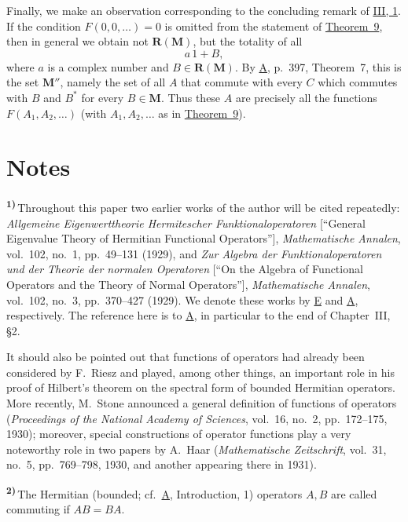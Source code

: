 \documentclass[12pt,b5paper,twoside]{article}
\newcommand{\originalnote}[1]{%
  \par\smallskip\noindent\hypertarget{note:#1}{\textsuperscript{\textbf{#1)}}}\,}
\begin{document}
Finally, we make an observation corresponding to the concluding remark of
\hyperref[sec:III.1]{III, 1}.  If the condition $F(0,0,\ldots)=0$ is omitted from the
statement of \hyperref[thm:9]{Theorem~9}, then in general we obtain not
$\mathbf R(\mathbf M)$, but the totality of all
\[
 a\,1+B,
\]
where $a$ is a complex number and $B\in \mathbf R(\mathbf M)$.  By \hyperref[ref:A]{A}, p.~397,
Theorem~7, this is the set $\mathbf M''$, namely the set of all $A$ that commute
with every $C$ which commutes with $B$ and $B^*$ for every $B\in \mathbf M$.  Thus
these $A$ are precisely all the functions $F(A_1,A_2,\ldots)$ (with
$A_1,A_2,\ldots$ as in \hyperref[thm:9]{Theorem~9}).

\section*{Notes}
\label{sec:notes}

\originalnote{1}Throughout this paper two earlier works of the author will be cited
repeatedly: \label{ref:E}\emph{Allgemeine Eigenwerttheorie
Hermitescher Funktionaloperatoren} [``General Eigenvalue Theory of Hermitian
Functional Operators''], \emph{Mathematische Annalen}, vol.~102, no.~1,
pp.~49--131 (1929), and \label{ref:A}\emph{Zur Algebra der
Funktionaloperatoren und der Theorie der normalen Operatoren} [``On the Algebra
of Functional Operators and the Theory of Normal Operators''],
\emph{Mathematische Annalen}, vol.~102, no.~3, pp.~370--427 (1929).  We denote these
works by \hyperref[ref:E]{E} and \hyperref[ref:A]{A}, respectively.  The reference here is to
\hyperref[ref:A]{A}, in particular to the end
of Chapter~III, \S2.

It should also be pointed out that functions of operators had already been considered
by F.~Riesz and played, among other things, an important role in his proof of Hilbert's
theorem on the spectral form of bounded Hermitian operators.  More recently, M.~Stone
announced a general definition of functions of operators (\emph{Proceedings of the
National Academy of Sciences}, vol.~16, no.~2, pp.~172--175, 1930); moreover, special
constructions of operator functions play a very noteworthy role in two papers by
A.~Haar (\emph{Mathematische Zeitschrift}, vol.~31, no.~5, pp.~769--798, 1930, and
another appearing there in 1931).

\originalnote{2}The Hermitian (bounded; cf.\ \hyperref[ref:A]{A}, Introduction, 1) operators $A,B$ are
called commuting if $AB=BA$.
\end{document}
